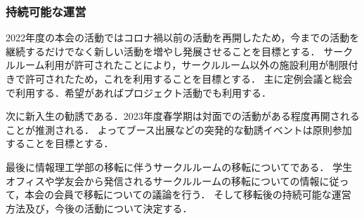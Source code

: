 \subsubsection*{持続可能な運営}
2022年度の本会の活動ではコロナ禍以前の活動を再開したため，今までの活動を継続するだけでなく新しい活動を増やし発展させることを目標とする．
サークルルーム利用が許可されたことにより，サークルルーム以外の施設利用が制限付きで許可されたため，これを利用することを目標とする．
主に定例会議と総会で利用する．希望があればプロジェクト活動でも利用する．

次に新入生の勧誘である．2023年度春学期は対面での活動がある程度再開されることが推測される．
よってブース出展などの突発的な勧誘イベントは原則参加することを目標とする．

最後に情報理工学部の移転に伴うサークルルームの移転についてである．
学生オフィスや学友会から発信されるサークルルームの移転についての情報に従って，本会の会員で移転についての議論を行う．
そして移転後の持続可能な運営方法及び，今後の活動について決定する．
